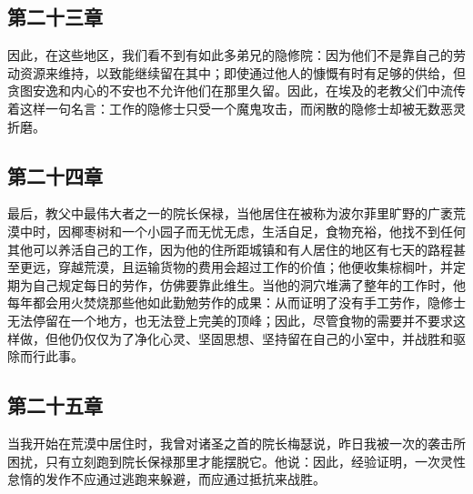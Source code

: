 
\subsection{第二十三章}

\par

因此，在这些地区，我们看不到有如此多弟兄的隐修院：因为他们不是靠自己的劳动资源来维持，以致能继续留在其中；即使通过他人的慷慨有时有足够的供给，但贪图安逸和内心的不安也不允许他们在那里久留。因此，在埃及的老教父们中流传着这样一句名言：工作的隐修士只受一个魔鬼攻击，而闲散的隐修士却被无数恶灵折磨。\par


\subsection{第二十四章}

\par

最后，教父中最伟大者之一的院长保禄，当他居住在被称为波尔菲里旷野的广袤荒漠中时，因椰枣树和一个小园子而无忧无虑，生活自足，食物充裕，他找不到任何其他可以养活自己的工作，因为他的住所距城镇和有人居住的地区有七天的路程甚至更远，穿越荒漠，且运输货物的费用会超过工作的价值；他便收集棕榈叶，并定期为自己规定每日的劳作，仿佛要靠此维生。当他的洞穴堆满了整年的工作时，他每年都会用火焚烧那些他如此勤勉劳作的成果：从而证明了没有手工劳作，隐修士无法停留在一个地方，也无法登上完美的顶峰；因此，尽管食物的需要并不要求这样做，但他仍仅仅为了净化心灵、坚固思想、坚持留在自己的小室中，并战胜和驱除而行此事。\par


\subsection{第二十五章}

\par

当我开始在荒漠中居住时，我曾对诸圣之首的院长梅瑟说，昨日我被一次的袭击所困扰，只有立刻跑到院长保禄那里才能摆脱它。他说：因此，经验证明，一次灵性怠惰的发作不应通过逃跑来躲避，而应通过抵抗来战胜。\par

